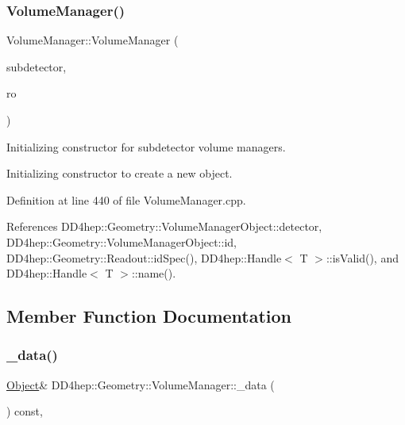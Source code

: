 \hypertarget{class_d_d4hep_1_1_geometry_1_1_volume_manager_ae1612218645bcd2734d83519d352aea9}{}\label{class_d_d4hep_1_1_geometry_1_1_volume_manager_ae1612218645bcd2734d83519d352aea9} 
\subsubsection{\texorpdfstring{Volume\+Manager()}{VolumeManager()}\hspace{0.1cm}{\footnotesize\ttfamily [6/6]}}
{\footnotesize\ttfamily Volume\+Manager\+::\+Volume\+Manager (\begin{DoxyParamCaption}\item[{\hyperlink{class_d_d4hep_1_1_geometry_1_1_det_element}{Det\+Element}}]{subdetector,  }\item[{\hyperlink{class_d_d4hep_1_1_geometry_1_1_readout}{Readout}}]{ro }\end{DoxyParamCaption})}



Initializing constructor for subdetector volume managers. 

Initializing constructor to create a new object. 

Definition at line 440 of file Volume\+Manager.\+cpp.



References D\+D4hep\+::\+Geometry\+::\+Volume\+Manager\+Object\+::detector, D\+D4hep\+::\+Geometry\+::\+Volume\+Manager\+Object\+::id, D\+D4hep\+::\+Geometry\+::\+Readout\+::id\+Spec(), D\+D4hep\+::\+Handle$<$ T $>$\+::is\+Valid(), and D\+D4hep\+::\+Handle$<$ T $>$\+::name().



\subsection{Member Function Documentation}
\hypertarget{class_d_d4hep_1_1_geometry_1_1_volume_manager_ae553c9b75d52a6ed8d38867fca2cf9a0}{}\label{class_d_d4hep_1_1_geometry_1_1_volume_manager_ae553c9b75d52a6ed8d38867fca2cf9a0} 
\subsubsection{\texorpdfstring{\+\_\+data()}{\_data()}}
{\footnotesize\ttfamily \hyperlink{class_d_d4hep_1_1_geometry_1_1_volume_manager_ac464fd441e5c72fb082e8cc6dd0937c4}{Object}\& D\+D4hep\+::\+Geometry\+::\+Volume\+Manager\+::\+\_\+data (\begin{DoxyParamCaption}{ }\end{DoxyParamCaption}) const\hspace{0.3cm}{\ttfamily [inline]}, {\ttfamily [protected]}}



